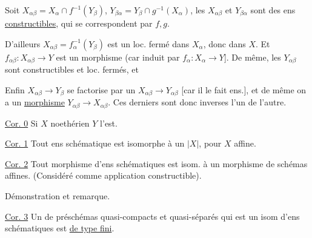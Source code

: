 Soit $X_{\alpha\beta}=X_\alpha\cap f^{-1}(Y_\beta)$, $Y_{\beta\alpha}=Y_\beta\cap g^{-1}(X_\alpha)$, les $X_{\alpha\beta}$ et $Y_{\beta\alpha}$ sont des ens \uline{constructibles}, qui se correspondent par $f,g$.



D'ailleurs $X_{\alpha\beta}=f_\alpha^{-1}(Y_\beta)$ est un  loc. fermé dans $X_\alpha$, donc dans $X$. Et $f_{\alpha\beta}:X_{\alpha\beta}\longrightarrow Y$ est un morphisme  (car induit par $f_\alpha:X_\alpha\longrightarrow Y$].  De même, les $Y_{\alpha\beta}$ sont constructibles et loc. fermés, et 

Enfin  $X_{\alpha\beta}\longrightarrow Y_\beta$ se factorise par un  $X_{\alpha\beta}\longrightarrow Y_{\alpha\beta}$ [car il le fait ens.], et de même on a un \uline{morphisme} $Y_{\alpha\beta}\longrightarrow X_{\alpha\beta}$. Ces derniers sont donc inverses l'un de l'autre.

\uline{Cor. 0} Si $X$ noethérien $Y$ l'est.

\uline{Cor. 1} Tout ens schématique est isomorphe à un $|X|$, pour $X$ affine.

\uline{Cor. 2} Tout morphisme d'ens schématiques est isom. à un morphisme de  schémas affines. (Considéré comme application constructible).

Démonstration et remarque.


\uline{Cor. 3} Un   de préschémas quasi-compacts et quasi-séparés qui est un isom d'ens schématiques est \uline{de type fini}.
